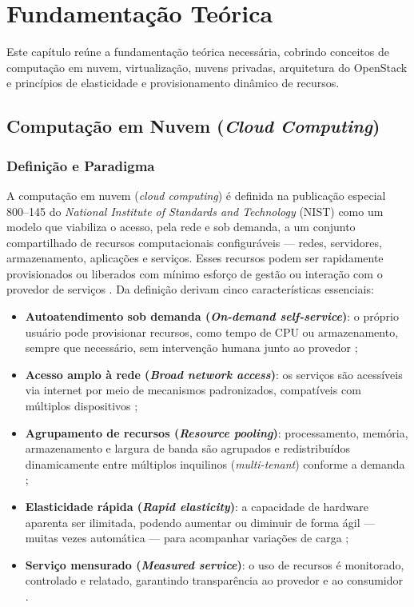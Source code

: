 \chapter{Fundamentação Teórica}
\setcounter{table}{0}

Este capítulo reúne a fundamentação teórica necessária, cobrindo conceitos de computação em nuvem, virtualização, nuvens privadas, arquitetura do OpenStack e princípios de elasticidade e provisionamento dinâmico de recursos.

\section{Computação em Nuvem (\textit{Cloud Computing})}
\label{sec:cloud-computing}

\subsection{Definição e Paradigma}

A computação em nuvem (\textit{cloud computing}) é definida na publicação especial\,800--145 do \textit{National Institute of Standards and Technology} (NIST) como um modelo que viabiliza o acesso, pela rede e sob demanda, a um conjunto compartilhado de recursos computacionais configuráveis — redes, servidores, armazenamento, aplicações e serviços. Esses recursos podem ser rapidamente provisionados ou liberados com mínimo esforço de gestão ou interação com o provedor de serviços \cite{mell2011}. Da definição derivam cinco características essenciais:

\begin{itemize}
    \item \textbf{Autoatendimento sob demanda (\textit{On-demand self-service})}: o próprio usuário pode provisionar recursos, como tempo de CPU ou armazenamento, sempre que necessário, sem intervenção humana junto ao provedor \cite{mell2011};
    \item \textbf{Acesso amplo à rede (\textit{Broad network access})}: os serviços são acessíveis via internet por meio de mecanismos padronizados, compatíveis com múltiplos dispositivos \cite{mell2011};
    \item \textbf{Agrupamento de recursos (\textit{Resource pooling})}: processamento, memória, armazenamento e largura de banda são agrupados e redistribuídos dinamicamente entre múltiplos inquilinos (\textit{multi-tenant}) conforme a demanda \cite{mell2011};
    \item \textbf{Elasticidade rápida (\textit{Rapid elasticity})}: a capacidade de hardware aparenta ser ilimitada, podendo aumentar ou diminuir de forma ágil — muitas vezes automática — para acompanhar variações de carga \cite{mell2011};
    \item \textbf{Serviço mensurado (\textit{Measured service})}: o uso de recursos é monitorado, controlado e relatado, garantindo transparência ao provedor e ao consumidor \cite{mell2011}.
\end{itemize}

